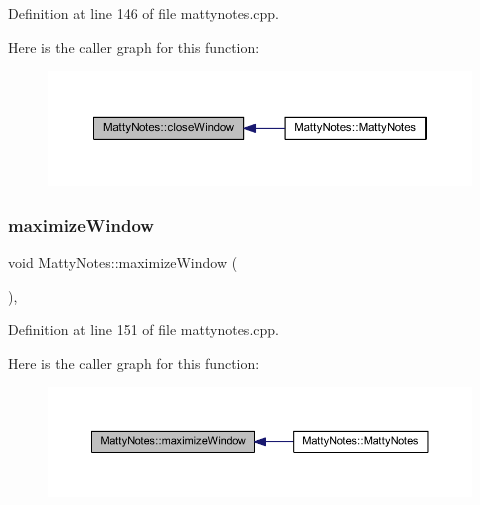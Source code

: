 Definition at line 146 of file mattynotes.\+cpp.

Here is the caller graph for this function\+:
\nopagebreak
\begin{figure}[H]
\begin{center}
\leavevmode
\includegraphics[width=350pt]{classMattyNotes_a63c0d10781a0acc57387682282aded37_icgraph}
\end{center}
\end{figure}
\hypertarget{classMattyNotes_a49cfcd1087c5f3c0c9f5ced2b7675e6f}{}\label{classMattyNotes_a49cfcd1087c5f3c0c9f5ced2b7675e6f} 
\subsubsection{\texorpdfstring{maximize\+Window}{maximizeWindow}}
{\footnotesize\ttfamily void Matty\+Notes\+::maximize\+Window (\begin{DoxyParamCaption}{ }\end{DoxyParamCaption})\hspace{0.3cm}{\ttfamily [private]}, {\ttfamily [slot]}}



Definition at line 151 of file mattynotes.\+cpp.

Here is the caller graph for this function\+:
\nopagebreak
\begin{figure}[H]
\begin{center}
\leavevmode
\includegraphics[width=350pt]{classMattyNotes_a49cfcd1087c5f3c0c9f5ced2b7675e6f_icgraph}
\end{center}
\end{figure}
\hypertarget{classMattyNotes_a59034e42bf605fafd6b37e513b6f85fb}{}\label{classMattyNotes_a59034e42bf605fafd6b37e513b6f85fb} 
